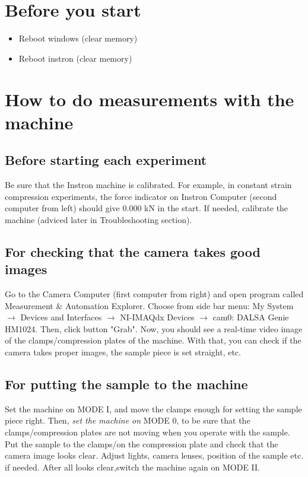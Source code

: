 \documentclass[a4paper]{article}
\begin{document}
\section{Before you start}

\begin{itemize}
  \item Reboot windows (clear memory)
  \item Reboot instron (clear memory)
\end{itemize}

\section{How to do measurements with the machine}

\subsection{Before starting each experiment}

Be sure that the Instron machine is calibrated. For example, in constant
strain compression experiments, the force indicator on Instron Computer 
(second computer from left) should give 0.000 kN in the start. If needed, 
calibrate the machine (adviced later in Troubleshooting section).

\subsection{For checking that the camera takes good images}

Go to the Camera Computer (first computer from right) and open program 
called Measurement \& Automation Explorer. Choose from side bar menu: 
My System $\rightarrow$ Devices and Interfaces $\rightarrow$ NI-IMAQdx Devices 
$\rightarrow$ cam0: DALSA Genie HM1024. Then, click button "Grab". Now, you 
should see a real-time video image of the clamps/compression plates of the 
machine. With that, you can check if the camera takes proper images, the 
sample piece is set straight, etc.

\subsection{For putting the sample to the machine}

Set the machine on \textsf{MODE I}, and move the clamps enough for setting 
the sample piece right. Then, \textit{set the machine on} \textsf{MODE 0}, 
to be sure that the clamps/compression plates are not moving when you operate 
with the sample. Put the sample to the clamps/on the compression plate and 
check that the camera image looks clear. Adjust lights, camera lenses, 
position of the sample etc. if needed. After all looks clear,switch the 
machine again on \textsf{MODE II}.
\end{document}
